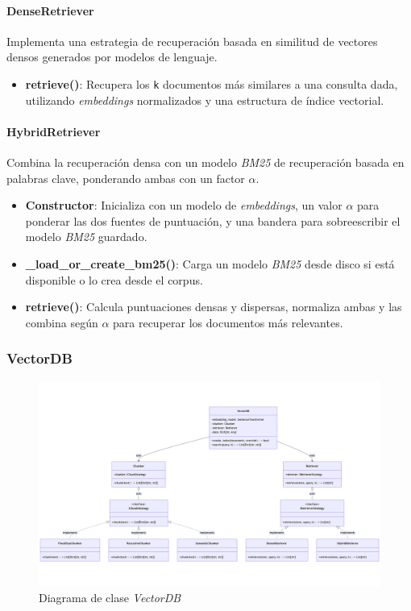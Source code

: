 \documentclass[12pt,letterpaper]{article}
\begin{document}
\paragraph{DenseRetriever}

Implementa una estrategia de recuperación basada en similitud de vectores densos generados por modelos de lenguaje.

\begin{itemize}
    \item \textbf{retrieve()}: Recupera los \texttt{k} documentos más similares a una consulta dada, utilizando \textit{embeddings} normalizados y una estructura de índice vectorial.
\end{itemize}

\paragraph{HybridRetriever}

Combina la recuperación densa con un modelo \textit{BM25} de recuperación basada en palabras clave, ponderando ambas con un factor $\alpha$.

\begin{itemize}
    \item \textbf{Constructor}: Inicializa con un modelo de \textit{embeddings}, un valor $\alpha$ para ponderar las dos fuentes de puntuación, y una bandera para sobreescribir el modelo \textit{BM25} guardado.
    \item \textbf{\_load\_or\_create\_bm25()}: Carga un modelo \textit{BM25} desde disco si está disponible o lo crea desde el corpus.
    \item \textbf{retrieve()}: Calcula puntuaciones densas y dispersas, normaliza ambas y las combina según $\alpha$ para recuperar los documentos más relevantes.
\end{itemize}

\subsubsection{VectorDB}

\begin{figure}[htp]
    \centering
    \includegraphics[width=1\linewidth]{img/vectordb.png}
    \caption{Diagrama de clase \textit{VectorDB}}
    \label{fig:vectordb}
\end{figure}
\end{document}
